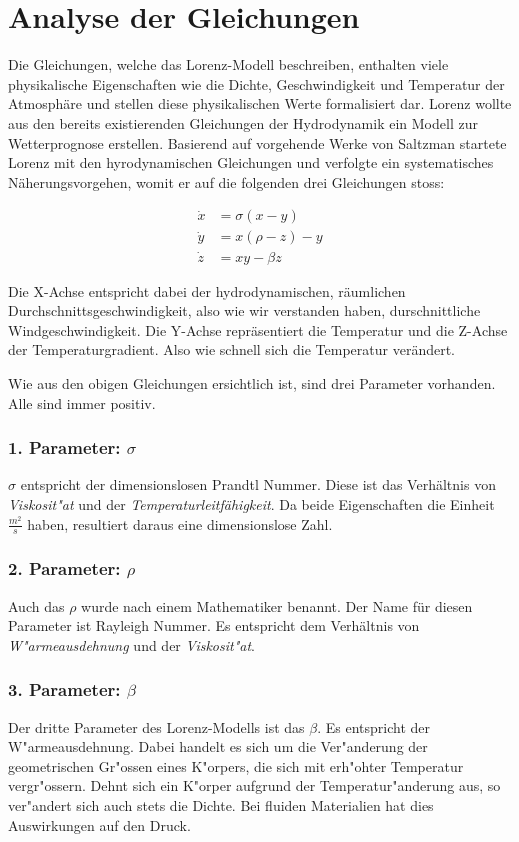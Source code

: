 
\section{Analyse der Gleichungen}
Die Gleichungen, welche das Lorenz-Modell beschreiben, enthalten viele physikalische Eigenschaften wie die Dichte, Geschwindigkeit und Temperatur der Atmosphäre und stellen diese physikalischen Werte formalisiert dar. Lorenz wollte aus den bereits existierenden Gleichungen der Hydrodynamik ein Modell zur Wetterprognose erstellen. Basierend auf vorgehende Werke von Saltzman startete Lorenz mit den hyrodynamischen Gleichungen und verfolgte ein systematisches Näherungsvorgehen, womit er auf die folgenden drei Gleichungen stoss:

\begin{align}
\dot{x} &= \sigma(x - y)\\
\dot{y} &= x(\rho - z) - y\\
\dot{z} &= xy - \beta z
\end{align}

Die X-Achse entspricht dabei der hydrodynamischen, räumlichen Durchschnittsgeschwindigkeit, also wie wir verstanden haben, durschnittliche Windgeschwindigkeit. 
Die Y-Achse repräsentiert die Temperatur und die Z-Achse der Temperaturgradient. Also wie schnell sich die Temperatur verändert. 

Wie aus den obigen Gleichungen ersichtlich ist, sind drei Parameter vorhanden. Alle sind immer positiv.

\subsubsection{1. Parameter: $\sigma$}
$\sigma$ entspricht der dimensionslosen Prandtl Nummer. Diese ist das Verhältnis von \textit{Viskosit"at} und der \textit{Temperaturleitfähigkeit}. Da beide Eigenschaften die Einheit $\frac{m^2}{s}$ haben, resultiert daraus eine dimensionslose Zahl.

\subsubsection{2. Parameter: $\rho$}
Auch das $\rho$ wurde nach einem Mathematiker benannt. Der Name für diesen Parameter ist Rayleigh Nummer. Es entspricht dem Verhältnis von \textit{W"armeausdehnung} und der \textit{Viskosit"at}.

\subsubsection{3. Parameter: $\beta$}
Der dritte Parameter des Lorenz-Modells ist das $\beta$. Es entspricht der W"armeausdehnung. Dabei handelt es sich um die Ver"anderung der geometrischen Gr"ossen eines K"orpers, die sich mit erh"ohter Temperatur vergr"ossern. Dehnt sich ein K"orper aufgrund der Temperatur"anderung aus, so ver"andert sich auch stets die Dichte. Bei fluiden Materialien hat dies Auswirkungen auf den Druck. 

